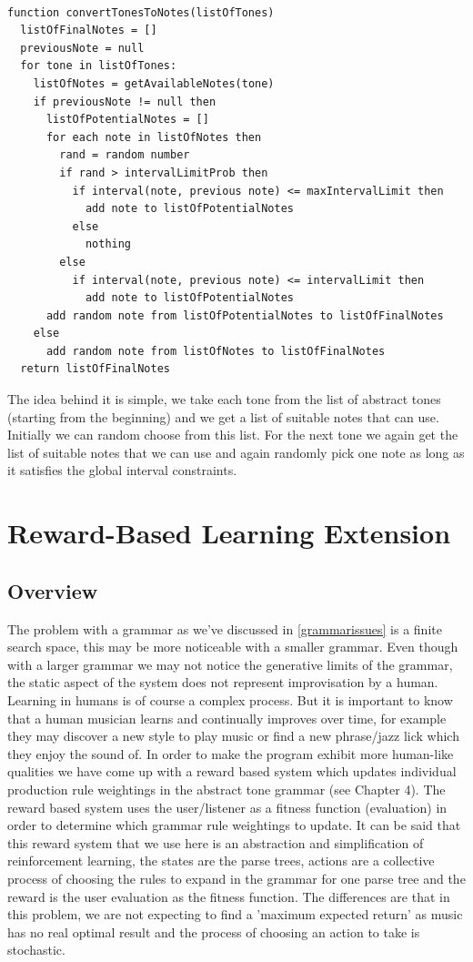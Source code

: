 \documentclass[pdftex,12pt,a4paper]{report}
\begin{document}
\begin{verbatim}

function convertTonesToNotes(listOfTones)
  listOfFinalNotes = []
  previousNote = null
  for tone in listOfTones:
    listOfNotes = getAvailableNotes(tone)
    if previousNote != null then
      listOfPotentialNotes = []
      for each note in listOfNotes then
        rand = random number
        if rand > intervalLimitProb then
          if interval(note, previous note) <= maxIntervalLimit then
            add note to listOfPotentialNotes
          else
            nothing
        else
          if interval(note, previous note) <= intervalLimit then
            add note to listOfPotentialNotes
      add random note from listOfPotentialNotes to listOfFinalNotes
    else
      add random note from listOfNotes to listOfFinalNotes
  return listOfFinalNotes

\end{verbatim}

The idea behind it is simple, we take each tone from the list of abstract tones (starting from the beginning) and we get a list of suitable notes that can use. Initially we can random choose from this list. For the next tone we again get the list of suitable notes that we can use and again randomly pick one note as long as it satisfies the global interval constraints.


\chapter{Reward-Based Learning Extension}

\section{Overview}
The problem with a grammar as we've discussed in \ref{grammarissues} is a finite search space, this may be more noticeable with a smaller grammar. Even though with a larger grammar we may not notice the generative limits of the grammar, the static aspect of the system does not represent improvisation by a human. Learning in humans is of course a complex process. But it is important to know that a human musician learns and continually improves over time, for example they may discover a new style to play music or find a new phrase/jazz lick which they enjoy the sound of. In order to make the program exhibit more human-like qualities we have come up with a reward based system which updates individual production rule weightings in the abstract tone grammar (see Chapter 4). The reward based system uses the user/listener as a fitness function (evaluation) in order to determine which grammar rule weightings to update. It can be said that this reward system that we use here is an abstraction and simplification of reinforcement learning, the states are the parse trees, actions are a collective process of choosing the rules to expand in the grammar for one parse tree and the reward is the user evaluation as the fitness function. The differences are that in this problem, we are not expecting to find a 'maximum expected return' as music has no real optimal result and the process of choosing an action to take is stochastic.
\end{document}
